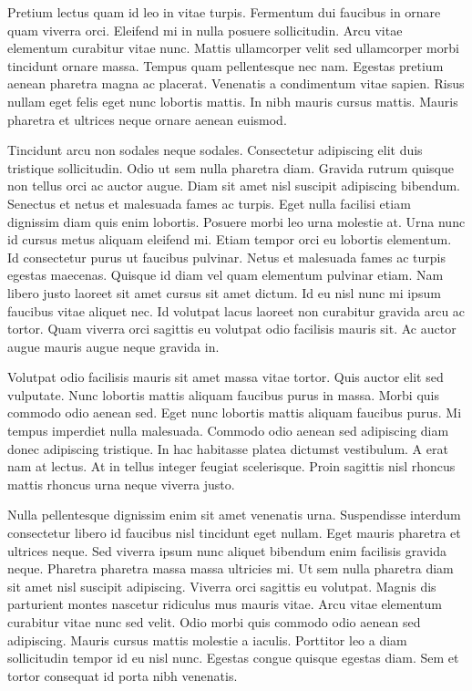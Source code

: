 \documentclass[11pt,a4paper]{article}
\begin{document}
Pretium lectus quam id leo in vitae turpis. Fermentum dui faucibus in ornare quam viverra orci. Eleifend mi in nulla posuere sollicitudin. Arcu vitae elementum curabitur vitae nunc. Mattis ullamcorper velit sed ullamcorper morbi tincidunt ornare massa. Tempus quam pellentesque nec nam. Egestas pretium aenean pharetra magna ac placerat. Venenatis a condimentum vitae sapien. Risus nullam eget felis eget nunc lobortis mattis. In nibh mauris cursus mattis. Mauris pharetra et ultrices neque ornare aenean euismod.

Tincidunt arcu non sodales neque sodales. Consectetur adipiscing elit duis tristique sollicitudin. Odio ut sem nulla pharetra diam. Gravida rutrum quisque non tellus orci ac auctor augue. Diam sit amet nisl suscipit adipiscing bibendum. Senectus et netus et malesuada fames ac turpis. Eget nulla facilisi etiam dignissim diam quis enim lobortis. Posuere morbi leo urna molestie at. Urna nunc id cursus metus aliquam eleifend mi. Etiam tempor orci eu lobortis elementum. Id consectetur purus ut faucibus pulvinar. Netus et malesuada fames ac turpis egestas maecenas. Quisque id diam vel quam elementum pulvinar etiam. Nam libero justo laoreet sit amet cursus sit amet dictum. Id eu nisl nunc mi ipsum faucibus vitae aliquet nec. Id volutpat lacus laoreet non curabitur gravida arcu ac tortor. Quam viverra orci sagittis eu volutpat odio facilisis mauris sit. Ac auctor augue mauris augue neque gravida in.

Volutpat odio facilisis mauris sit amet massa vitae tortor. Quis auctor elit sed vulputate. Nunc lobortis mattis aliquam faucibus purus in massa. Morbi quis commodo odio aenean sed. Eget nunc lobortis mattis aliquam faucibus purus. Mi tempus imperdiet nulla malesuada. Commodo odio aenean sed adipiscing diam donec adipiscing tristique. In hac habitasse platea dictumst vestibulum. A erat nam at lectus. At in tellus integer feugiat scelerisque. Proin sagittis nisl rhoncus mattis rhoncus urna neque viverra justo.

Nulla pellentesque dignissim enim sit amet venenatis urna. Suspendisse interdum consectetur libero id faucibus nisl tincidunt eget nullam. Eget mauris pharetra et ultrices neque. Sed viverra ipsum nunc aliquet bibendum enim facilisis gravida neque. Pharetra pharetra massa massa ultricies mi. Ut sem nulla pharetra diam sit amet nisl suscipit adipiscing. Viverra orci sagittis eu volutpat. Magnis dis parturient montes nascetur ridiculus mus mauris vitae. Arcu vitae elementum curabitur vitae nunc sed velit. Odio morbi quis commodo odio aenean sed adipiscing. Mauris cursus mattis molestie a iaculis. Porttitor leo a diam sollicitudin tempor id eu nisl nunc. Egestas congue quisque egestas diam. Sem et tortor consequat id porta nibh venenatis.
\end{document}
